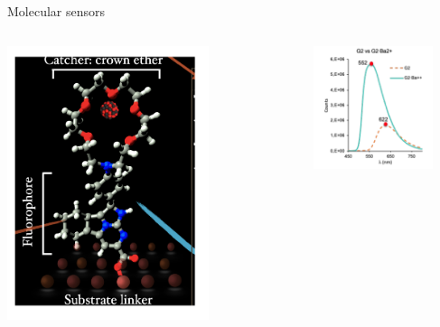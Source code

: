 \documentclass [aspectratio=169]{beamer}
\begin{document}
\begin{frame}{Molecular sensors}
\begin{columns}

\includegraphics[width=0.70\textwidth]{molecularI.png}

\includegraphics[width=0.80\textwidth]{g2.png}
\end{columns}
\end{frame}
\end{document}
